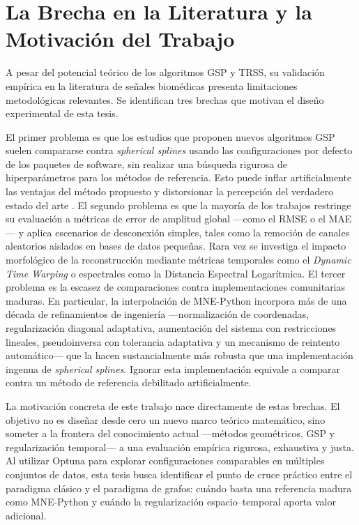 \section{La Brecha en la Literatura y la Motivación del Trabajo}

A pesar del potencial teórico de los algoritmos GSP y TRSS, su validación empírica en la literatura de señales biomédicas presenta limitaciones metodológicas relevantes. Se identifican tres brechas que motivan el diseño experimental de esta tesis.

El primer problema es que los estudios que proponen nuevos algoritmos GSP suelen compararse contra \textit{spherical splines} usando las configuraciones por defecto de los paquetes de software, sin realizar una búsqueda rigurosa de hiperparámetros para los métodos de referencia. Esto puede inflar artificialmente las ventajas del método propuesto y distorsionar la percepción del verdadero estado del arte \cite{saldivia2026benchmark}. El segundo problema es que la mayoría de los trabajos restringe su evaluación a métricas de error de amplitud global —como el RMSE o el MAE— y aplica escenarios de desconexión simples, tales como la remoción de canales aleatorios aislados en bases de datos pequeñas. Rara vez se investiga el impacto morfológico de la reconstrucción mediante métricas temporales como el \textit{Dynamic Time Warping} o espectrales como la Distancia Espectral Logarítmica. El tercer problema es la escasez de comparaciones contra implementaciones comunitarias maduras. En particular, la interpolación de MNE-Python incorpora más de una década de refinamientos de ingeniería —normalización de coordenadas, regularización diagonal adaptativa, aumentación del sistema con restricciones lineales, pseudoinversa con tolerancia adaptativa y un mecanismo de reintento automático— que la hacen sustancialmente más robusta que una implementación ingenua de \textit{spherical splines}. Ignorar esta implementación equivale a comparar contra un método de referencia debilitado artificialmente.

La motivación concreta de este trabajo nace directamente de estas brechas. El objetivo no es diseñar desde cero un nuevo marco teórico matemático, sino someter a la frontera del conocimiento actual ---métodos geométricos, GSP y regularización temporal--- a una evaluación empírica rigurosa, exhaustiva y justa. Al utilizar Optuna \cite{akiba2019optuna} para explorar configuraciones comparables en múltiples conjuntos de datos, esta tesis busca identificar el punto de cruce práctico entre el paradigma clásico y el paradigma de grafos: cuándo basta una referencia madura como MNE-Python y cuándo la regularización espacio--temporal aporta valor adicional.
